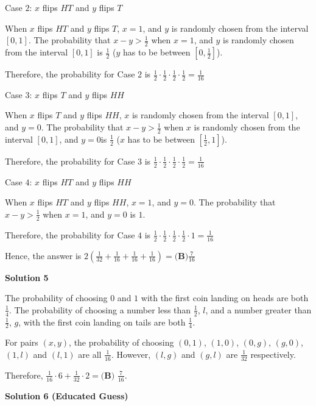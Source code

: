 \begin{enumerate}
 Case $2$: $x$ flips $HT$ and $y$ flips $T$

 When $x$ flips $HT$ and $y$ flips $T$, $x=1$, and $y$ is randomly chosen from the interval $[0,1]$. The probability that $x-y > \frac{1}{2}$ when $x=1$, and $y$ is randomly chosen from the interval $[0,1]$ is $\frac12$ ($y$ has to be between $[0,\frac12]$).

 Therefore, the probability for Case $2$ is $\frac12 \cdot \frac12 \cdot \frac12 \cdot \frac12 = \frac{1}{16}$

 Case $3$: $x$ flips $T$ and $y$ flips $HH$

 When $x$ flips $T$ and $y$ flips $HH$, $x$ is randomly chosen from the interval $[0,1]$, and $y = 0$. The probability that $x-y > \frac{1}{2}$ when $x$ is randomly chosen from the interval $[0,1]$, and $y = 0$is $\frac12$ ($x$ has to be between $[\frac12,1]$).

 Therefore, the probability for Case $3$ is $\frac12 \cdot \frac12 \cdot \frac12 \cdot \frac12 = \frac{1}{16}$

 Case $4$: $x$ flips $HT$ and $y$ flips $HH$

 When $x$ flips $HT$ and $y$ flips $HH$, $x=1$, and $y = 0$. The probability that $x-y > \frac{1}{2}$ when $x=1$, and $y = 0$ is $1$.

 Therefore, the probability for Case $4$ is $\frac12 \cdot \frac12 \cdot \frac12 \cdot \frac12 \cdot 1= \frac{1}{16}$

 Hence, the answer is $2(\frac{1}{32} + \frac{1}{16} + \frac{1}{16} + \frac{1}{16}) = \boxed{\textbf{(B)}\frac{7}{16}}$




\textbf{Solution 5}

The probability of choosing $0$ and $1$ with the first coin landing on heads are both $\frac{1}{4}$. The probability of choosing a number less than $\frac{1}{2}$, $l$, and a number greater than $\frac{1}{2}$, $g$, with the first coin landing on tails are both $\frac{1}{4}$.

 For pairs $(x, y)$, the probability of choosing $(0, 1)$, $(1, 0)$, $(0, g)$, $(g, 0)$, $(1, l)$ and $(l, 1)$ are all $\frac{1}{16}$. However, $(l, g)$ and $(g, l)$ are $\frac{1}{32}$ respectively.

 Therefore, $\frac{1}{16} \cdot 6 + \frac{1}{32} \cdot 2 = \boxed{\textbf{(B) } \frac{7}{16}}$.

 



\textbf{Solution 6 (Educated Guess)}


\end{enumerate}

